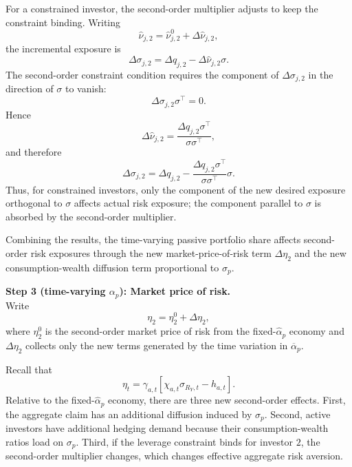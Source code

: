For a constrained investor, the second-order multiplier adjusts to keep the constraint binding.
Writing
\begin{equation}
    \hat{\nu}_{j,2}=\hat{\nu}_{j,2}^{0}+\Delta\hat{\nu}_{j,2},
\end{equation}
the incremental exposure is
\begin{equation}
    \Delta\sigma_{j,2}
    =\Delta q_{j,2}-\Delta\hat{\nu}_{j,2}\sigma.
\end{equation}
The second-order constraint condition requires the component of $\Delta\sigma_{j,2}$ in the direction of $\sigma$ to vanish:
\begin{equation}
    \Delta\sigma_{j,2}\sigma^\top=0.
\end{equation}
Hence
\begin{equation}
    \Delta\hat{\nu}_{j,2}
    =\frac{\Delta q_{j,2}\sigma^\top}{\sigma\sigma^\top},
\end{equation}
and therefore
\begin{equation}\label{eq:delta-sigma-j2-constrained-alpha-p}
    \Delta\sigma_{j,2}
    =\Delta q_{j,2}
    -\frac{\Delta q_{j,2}\sigma^\top}{\sigma\sigma^\top}\sigma.
\end{equation}
Thus, for constrained investors, only the component of the new desired exposure orthogonal to $\sigma$ affects actual risk exposure; the component parallel to $\sigma$ is absorbed by the second-order multiplier.

Combining the results, the time-varying passive portfolio share affects second-order risk exposures through the new market-price-of-risk term $\Delta\eta_2$ and the new consumption-wealth diffusion term proportional to $\sigma_p$.

\noindent\textbf{Step 3 (time-varying $\alpha_p$): Market price of risk.}\\
Write
\begin{equation}
    \eta_2=\eta_2^{0}+\Delta\eta_2,
\end{equation}
where $\eta_2^{0}$ is the second-order market price of risk from the fixed-$\hat{\alpha}_p$ economy and $\Delta\eta_2$ collects only the new terms generated by the time variation in $\overline{\alpha}_p$.

Recall that
\begin{equation}
    \eta_t=\gamma_{a,t}\left[\chi_{a,t}\sigma_{R_Y,t}-h_{a,t}\right].
\end{equation}
Relative to the fixed-$\hat{\alpha}_p$ economy, there are three new second-order effects.
First, the aggregate claim has an additional diffusion induced by $\sigma_p$.
Second, active investors have additional hedging demand because their consumption-wealth ratios load on $\sigma_p$.
Third, if the leverage constraint binds for investor $2$, the second-order multiplier changes, which changes effective aggregate risk aversion.

